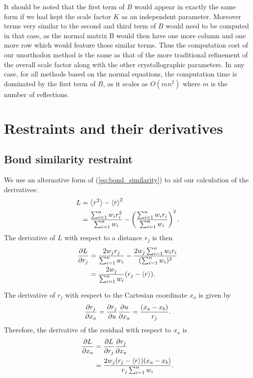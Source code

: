 \documentclass[pdf]{iucr}
\begin{document}
It should be noted that the first term of $B$ would appear in exactly the same form if we had kept the scale factor $K$ as an independent parameter. Moreover terms very similar to the second and third term of $B$ would need to be computed in that case, as the normal matrix B would then have one more column and one more row which would feature those similar terms. Thus the computation cost of our unorthodox method is the same as that of the more traditional refinement of the overall scale factor along with the other crystallographic parameters. In any case, for all methods based on the normal equations, the computation time is dominated by the first term of $B$, as it scales as $O(mn^2)$ where $m$ is the number of reflections.

\section{Restraints and their derivatives}

\subsection{Bond similarity restraint}
We use an alternative form of (\ref{eq:bond_similarity}) to aid our calculation of the derivatives:
\begin{align}
L &= \left\langle r^2 \right\rangle - \left\langle r \right\rangle^2 \nonumber\\
&= \frac{\sum_{i = 1}^n {w_i r_i^2}}{\sum_{i = 1}^n {w_i}} - 
    \left(\frac{\sum_{i = 1}^n {w_i r_i}}{\sum_{i = 1}^n {w_i}}\right)^2.
\end{align}
The derivative of $L$ with respect to a distance $r_j$ is then
\begin{align}
\frac{\partial L}{\partial r_j} &=
  \frac{2 w_j r_j}{\sum_{i=1}^n{w_i}}
  - \frac{2 w_j \sum_{i=1}^n w_i r_i}{(\sum_{i=1}^n w_i)^2}\nonumber\\
&= \frac{2 w_j}{\sum_{i=1}^n{w_i}}(r_j - \left\langle r \right\rangle).
\end{align}

The derivative of $r_j$ with respect to the Cartesian coordinate $x_a$ is given by
\begin{equation}
\frac{\partial r_j}{\partial x_a} = \frac{\partial r_j}{\partial u} \frac{\partial u}{\partial x_a}= \frac{(x_a - x_b)}{r_j}.
\end{equation}
Therefore, the derivative of the residual with respect to $x_a$ is
\begin{align}
\frac{\partial L}{\partial x_a} &= \frac{\partial L}{\partial r_j} \frac{\partial r_j}{\partial x_a}\nonumber\\
&= \frac{2 w_j (r_j - \left\langle r \right\rangle)(x_a - x_b)}{r_j \sum_{i=1}^n {w_i}}.
\end{align}
\end{document}
